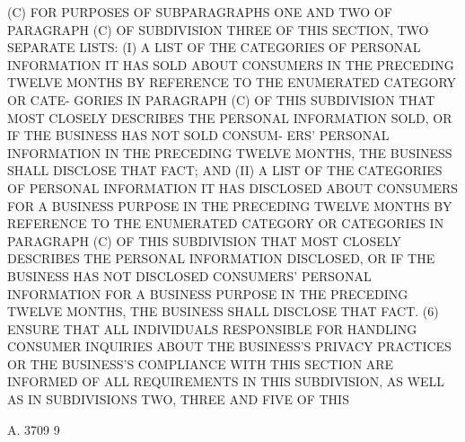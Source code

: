    (C) FOR PURPOSES OF SUBPARAGRAPHS ONE AND  TWO  OF  PARAGRAPH  (C)  OF
 SUBDIVISION THREE OF THIS SECTION, TWO SEPARATE LISTS: (I) A LIST OF THE
 CATEGORIES  OF  PERSONAL  INFORMATION IT HAS SOLD ABOUT CONSUMERS IN THE
 PRECEDING TWELVE MONTHS BY REFERENCE TO THE ENUMERATED CATEGORY OR CATE-
 GORIES IN PARAGRAPH (C) OF THIS SUBDIVISION THAT MOST CLOSELY  DESCRIBES
 THE  PERSONAL  INFORMATION SOLD, OR IF THE BUSINESS HAS NOT SOLD CONSUM-
 ERS' PERSONAL INFORMATION IN THE PRECEDING TWELVE MONTHS,  THE  BUSINESS
 SHALL  DISCLOSE THAT FACT; AND (II) A LIST OF THE CATEGORIES OF PERSONAL
 INFORMATION IT HAS DISCLOSED ABOUT CONSUMERS FOR A BUSINESS  PURPOSE  IN
 THE  PRECEDING  TWELVE MONTHS BY REFERENCE TO THE ENUMERATED CATEGORY OR
 CATEGORIES IN PARAGRAPH  (C)  OF  THIS  SUBDIVISION  THAT  MOST  CLOSELY
 DESCRIBES THE PERSONAL INFORMATION DISCLOSED, OR IF THE BUSINESS HAS NOT
 DISCLOSED  CONSUMERS' PERSONAL INFORMATION FOR A BUSINESS PURPOSE IN THE
 PRECEDING TWELVE MONTHS, THE BUSINESS SHALL DISCLOSE THAT FACT.
   (6) ENSURE THAT ALL  INDIVIDUALS  RESPONSIBLE  FOR  HANDLING  CONSUMER
 INQUIRIES  ABOUT  THE  BUSINESS'S  PRIVACY  PRACTICES  OR THE BUSINESS'S
 COMPLIANCE WITH THIS SECTION ARE INFORMED OF ALL  REQUIREMENTS  IN  THIS
 SUBDIVISION,  AS  WELL  AS  IN  SUBDIVISIONS TWO, THREE AND FIVE OF THIS

 A. 3709                             9
 
